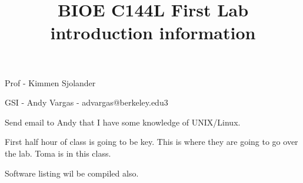 \documentclass[11pt]{article}
\title{BIOE C144L First Lab introduction information}
\begin{document}
\maketitle

Prof - Kimmen Sjolander

GSI  - Andy Vargas    - advargas@berkeley.edu3

Send email to Andy that I have some knowledge of UNIX/Linux.

First half hour of class is going to be key. This is where they are going to go
over the lab. Toma is in this class. 

Software listing wil be compiled also.
\end{document}
